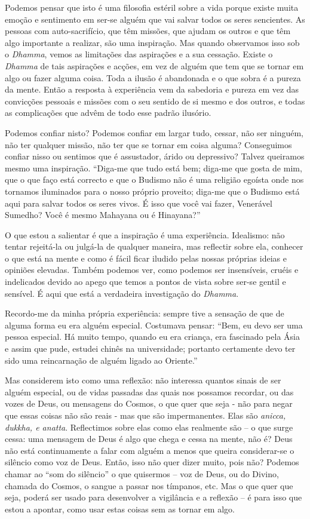 Podemos pensar que isto é uma filosofia estéril sobre a vida porque
existe muita emoção e sentimento em ser-se alguém que vai salvar todos
os seres sencientes. As pessoas com auto-sacrifício, que têm missões,
que ajudam os outros e que têm algo importante a realizar, são uma
inspiração. Mas quando observamos isso sob o \emph{Dhamma}, vemos as
limitações das aspirações e a sua cessação. Existe o \emph{Dhamma} de
tais aspirações e acções, em vez de alguém que tem que se tornar em algo
ou fazer alguma coisa. Toda a ilusão é abandonada e o que sobra é a
pureza da mente. Então a resposta à experiência vem da sabedoria e
pureza em vez das convicções pessoais e missões com o seu sentido de si
mesmo e dos outros, e todas as complicações que advêm de todo esse
padrão ilusório.

Podemos confiar nisto? Podemos confiar em largar tudo, cessar, não ser
ninguém, não ter qualquer missão, não ter que se tornar em coisa alguma?
Conseguimos confiar nisso ou sentimos que é assustador, árido ou
depressivo? Talvez queiramos mesmo uma inspiração. ``Diga-me que tudo
está bem; diga-me que gosta de mim, que o que faço está correcto e que o
Budismo não é uma religião egoísta onde nos tornamos iluminados para o
nosso próprio proveito; diga-me que o Budismo está aqui para salvar
todos os seres vivos. É isso que você vai fazer, Venerável Sumedho? Você
é mesmo Mahayana ou é Hinayana?''

O que estou a salientar é que a inspiração é uma experiência. Idealismo:
não tentar rejeitá-la ou julgá-la de qualquer maneira, mas reflectir
sobre ela, conhecer o que está na mente e como é fácil ficar iludido
pelas nossas próprias ideias e opiniões elevadas. Também podemos ver,
como podemos ser insensíveis, cruéis e indelicados devido ao apego que
temos a pontos de vista sobre ser-se gentil e sensível. É aqui que está
a verdadeira investigação do \emph{Dhamma}.

Recordo-me da minha própria experiência: sempre tive a sensação de que
de alguma forma eu era alguém especial. Costumava pensar: ``Bem, eu devo
ser uma pessoa especial. Há muito tempo, quando eu era criança, era
fascinado pela Ásia e assim que pude, estudei chinês na universidade;
portanto certamente devo ter sido uma reincarnação de alguém ligado ao
Oriente.''

Mas considerem isto como uma reflexão: não interessa quantos sinais de
ser alguém especial, ou de vidas passadas das quais nos possamos
recordar, ou das vozes de Deus, ou mensagens do Cosmos, o que quer que
seja - não para negar que essas coisas não são reais - mas que são
impermanentes. Elas são \emph{anicca, dukkha, e anatta}. Reflectimos
sobre elas como elas realmente são -- o que surge cessa: uma mensagem de
Deus é algo que chega e cessa na mente, não é? Deus não está
continuamente a falar com alguém a menos que queira considerar-se o
silêncio como voz de Deus. Então, isso não quer dizer muito, pois não?
Podemos chamar ao ``som do silêncio'' o que quisermos -- voz de Deus, ou
do Divino, chamada do Cosmos, o sangue a passar nos tímpanos, etc. Mas o
que quer que seja, poderá ser usado para desenvolver a vigilância e a
reflexão -- é para isso que estou a apontar, como usar estas coisas sem
as tornar em algo.

